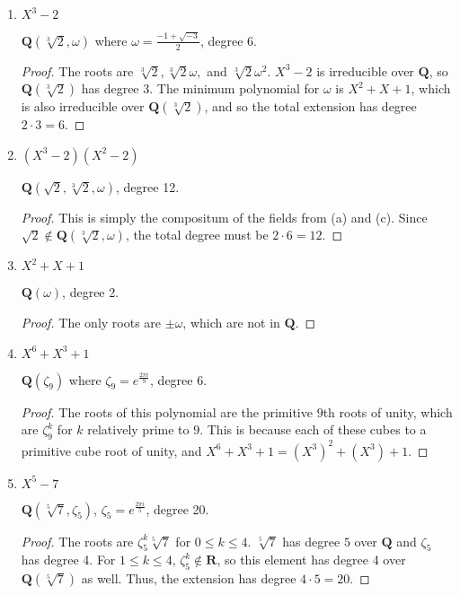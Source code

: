 \documentclass[10pt]{article}
\newcommand{\Q}{\mathbf{Q}}
\newcommand{\R}{\mathbf{R}}
\begin{document}
\begin{enumerate}
\begin{enumerate}
\item $X^3 - 2$

\noindent $\Q(\sqrt[3]{2}, \omega)$ where $\omega = \frac{-1 + \sqrt{-3}}{2}$, degree 6.

\begin{proof}
The roots are $\sqrt[3]{2}, \sqrt[3]{2}\omega,$ and $\sqrt[3]{2}\omega^2$.  $X^3 - 2$ is irreducible over $\Q$, so $\Q(\sqrt[3]{2})$ has degree $3$.  The minimum polynomial for $\omega$ is $X^2 + X + 1$, which is also irreducible over $\Q(\sqrt[3]{2})$, and so the total extension has degree $2 \cdot 3 = 6$.
\end{proof}

\item $(X^3 - 2)(X^2 - 2)$

\noindent $\Q(\sqrt{2}, \sqrt[3]{2}, \omega)$, degree 12.

\begin{proof}
This is simply the compositum of the fields from (a) and (c).  Since $\sqrt{2} \not \in \Q(\sqrt[3]{2},\omega)$, the total degree must be $2 \cdot 6 = 12$.
\end{proof}

\item $X^2 + X + 1$

\noindent $\Q(\omega)$, degree 2.

\begin{proof}
The only roots are $\pm \omega$, which are not in $\Q$.
\end{proof}

\item $X^6 + X^3 + 1$

\noindent $\Q(\zeta_9)$ where $\zeta_9 = e^{\frac{2\pi i}{9}}$, degree 6.

\begin{proof}
The roots of this polynomial are the primitive $9$th roots of unity, which are $\zeta_9^k$ for $k$ relatively prime to $9$.  This is because each of these cubes to a primitive cube root of unity, and $X^6 + X^3 + 1 = (X^3)^2 + (X^3) + 1$.
\end{proof}

\item $X^5 - 7$

\noindent $\Q(\sqrt[5]{7}, \zeta_5)$, $\zeta_5 = e^{\frac{2\pi i}{5}}$, degree 20.

\begin{proof}
The roots are $\zeta_5^k \sqrt[5]{7}$ for $0 \leq k \leq 4$.  $\sqrt[5]{7}$ has degree $5$ over $\Q$ and $\zeta_5$ has degree 4.  For $1 \leq k \leq 4$, $\zeta_5^k \not \in \R$, so this element has degree 4 over $\Q(\sqrt[5]{7})$ as well.  Thus, the extension has degree $4 \cdot 5 = 20$.
\end{proof}
\end{enumerate}


\end{enumerate}
\end{document}
